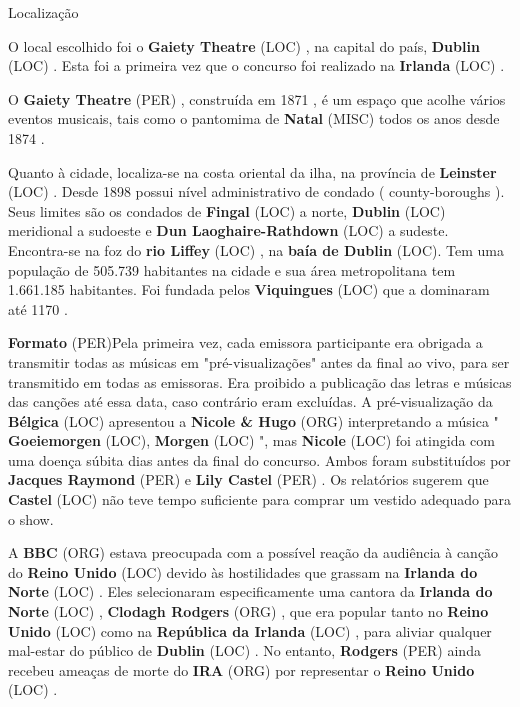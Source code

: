 \documentclass[12pt,a4paper]{article}
\begin{document}
Localização

O local escolhido foi o \textbf{Gaiety Theatre} (LOC) , na capital do país, \textbf{Dublin} (LOC) . Esta foi a primeira vez que o concurso foi realizado na \textbf{Irlanda} (LOC) .

O \textbf{Gaiety Theatre} (PER) , construída em 1871 , é um espaço que acolhe vários eventos musicais, tais como o pantomima de \textbf{Natal} (MISC) todos os anos desde 1874 .

Quanto à cidade, localiza-se na costa oriental da ilha, na província de \textbf{Leinster} (LOC) . Desde 1898 possui nível administrativo de condado ( county-boroughs ). Seus limites são os condados de \textbf{Fingal} (LOC) a norte, \textbf{Dublin} (LOC) meridional a sudoeste e \textbf{Dun Laoghaire-Rathdown} (LOC) a sudeste. Encontra-se na foz do \textbf{rio Liffey} (LOC) , na \textbf{baía de Dublin} (LOC). Tem uma população de 505.739 habitantes na cidade e sua área metropolitana tem 1.661.185 habitantes. Foi fundada pelos \textbf{Viquingues} (LOC) que a dominaram até 1170 .



\textbf{Formato} (PER)Pela primeira vez, cada emissora participante era obrigada a transmitir todas as músicas em "pré-visualizações" antes da final ao vivo, para ser transmitido em todas as emissoras. Era proibido a publicação das letras e músicas das canções até essa data, caso contrário eram excluídas. A pré-visualização da \textbf{Bélgica} (LOC) apresentou a \textbf{Nicole \& Hugo} (ORG) interpretando a música " \textbf{Goeiemorgen} (LOC), \textbf{Morgen} (LOC) ", mas \textbf{Nicole} (LOC) foi atingida com uma doença súbita dias antes da final do concurso. Ambos foram substituídos por \textbf{Jacques Raymond} (PER) e \textbf{Lily Castel} (PER) . Os relatórios sugerem que \textbf{Castel} (LOC) não teve tempo suficiente para comprar um vestido adequado para o show.

A \textbf{BBC} (ORG) estava preocupada com a possível reação da audiência à canção do \textbf{Reino Unido} (LOC) devido às hostilidades que grassam na \textbf{Irlanda do Norte} (LOC) . Eles selecionaram especificamente uma cantora da \textbf{Irlanda do Norte} (LOC) , \textbf{Clodagh Rodgers} (ORG) , que era popular tanto no \textbf{Reino Unido} (LOC) como na \textbf{República da Irlanda} (LOC) , para aliviar qualquer mal-estar do público de \textbf{Dublin} (LOC) . No entanto, \textbf{Rodgers} (PER) ainda recebeu ameaças de morte do \textbf{IRA} (ORG) por representar o \textbf{Reino Unido} (LOC) .
\end{document}

